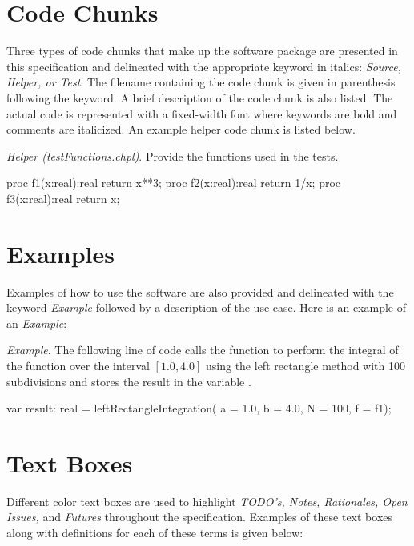 \label{Notation}

\section{Code Chunks}

Three types of code chunks that make up the software package are 
presented in this specification and delineated
with the appropriate keyword in italics: 
\textit{Source, Helper, or Test}.  The filename containing the code
chunk is given in parenthesis following the keyword. A brief description 
of the code chunk is also listed.
The actual code is represented with a fixed-width font where keywords are
bold and comments are italicized. An example helper code chunk is listed
below.

\textit{Helper (testFunctions.chpl)}. Provide the functions used
in the tests.
\begin{chapel}
proc f1(x:real):real {
  return x**3;
} 
proc f2(x:real):real {
  return 1/x;
} 
proc f3(x:real):real {
  return x;
} 
\end{chapel}

\section{Examples}

Examples of how to use the software are also provided and delineated with the
keyword \textit{Example} followed by a description of the use case. Here is
an example of an \textit{Example}:

\textit{Example}. The following line of code calls the function
 to perform the integral of the function 
over the interval $[1.0,4.0]$ using the left rectangle method with 100 subdivisions
and stores the result in the variable .
\begin{chapel}
var result: real = leftRectangleIntegration(
  a = 1.0, b = 4.0, N = 100, f = f1);
\end{chapel}

\section{Text Boxes}
Different color text boxes are used to highlight \textit{TODO's, Notes,
Rationales, Open Issues,} and \textit{Futures} throughout the specification.
Examples of these text boxes along with definitions for each of these terms
is given below:


